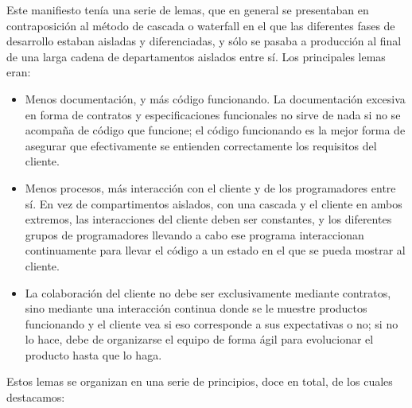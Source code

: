 Este manifiesto tenía una serie de lemas, que en general se presentaban en 
contraposición al método de cascada o waterfall en el que las diferentes 
fases de desarrollo estaban aisladas y diferenciadas, y sólo se pasaba a 
producción al final de una larga cadena de departamentos aislados entre sí. 
Los principales lemas eran:
\begin{itemize}
    \item Menos documentación, y más código funcionando. La documentación excesiva en 
    forma de contratos y especificaciones funcionales no sirve de nada si no se 
    acompaña de código que funcione; el código funcionando es la mejor forma de 
    asegurar que efectivamente se entienden correctamente los requisitos del 
    cliente.
    \item Menos procesos, más interacción con el cliente y de los 
    programadores entre sí. En vez de compartimentos aislados, con una 
    cascada y el cliente en ambos extremos, las interacciones del cliente 
    deben ser constantes, y los diferentes grupos de programadores llevando 
    a cabo ese programa interaccionan continuamente para llevar el código a 
    un estado en el que se pueda mostrar al cliente.
    \item La colaboración del cliente no debe ser exclusivamente mediante 
    contratos, sino mediante una interacción continua donde se le 
    muestre productos funcionando y el cliente vea si eso corresponde a sus 
    expectativas o no; si no lo hace, debe de organizarse el equipo de forma 
    ágil para evolucionar el producto hasta que lo haga.
\end{itemize}

Estos lemas se organizan en una serie de principios, doce en total, de los cuales destacamos:


